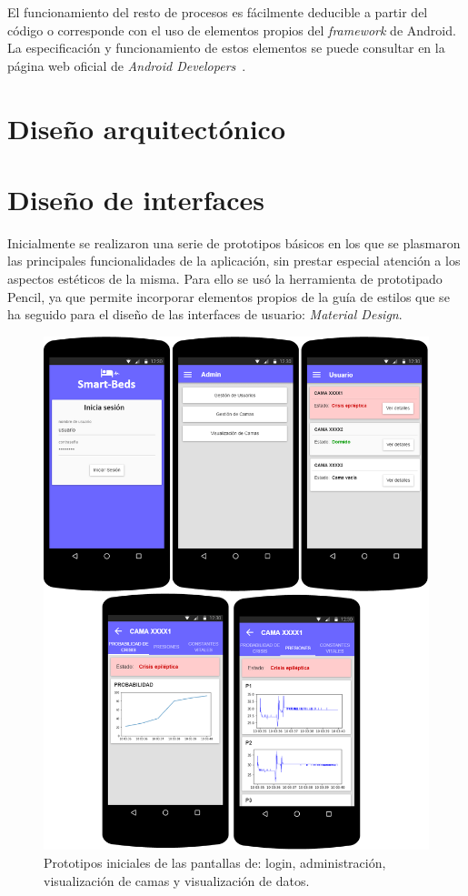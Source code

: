 El funcionamiento del resto de procesos es fácilmente deducible a partir del código o corresponde con el uso de elementos propios del \textit{framework} de Android. La especificación y funcionamiento de estos elementos se puede consultar en la página web oficial de \textit{Android Developers}~\cite{androiddevelopers}.  

\section{Diseño arquitectónico}

\section{Diseño de interfaces}

Inicialmente se realizaron una serie de prototipos básicos en los que se plasmaron las principales funcionalidades de la aplicación, sin prestar especial atención a los aspectos estéticos de la misma. Para ello se usó la herramienta de prototipado Pencil, ya que permite incorporar elementos propios de la guía de estilos que se ha seguido para el diseño de las interfaces de usuario: \textit{Material Design}. 

\begin{figure}
	\centering
	\includegraphics[width=1\textwidth]{../img/prototipos.png}
	\caption{Prototipos iniciales de las pantallas de: login, administración, visualización de camas y visualización de datos.}
	\label{fig:prototipos}
\end{figure}
